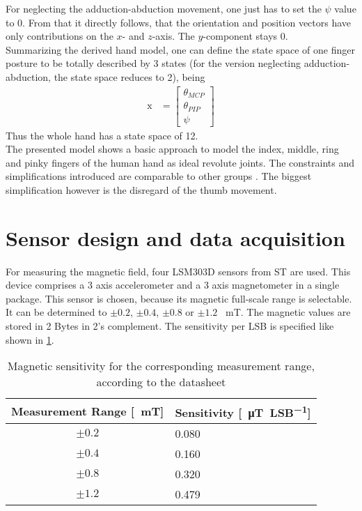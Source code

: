 For neglecting the adduction-abduction movement, one just has to set the $ \psi $ value to 0. From that it directly follows, that the orientation and position vectors have only contributions on the $ x $- and $ z $-axis. The $ y $-component stays 0.\\
Summarizing the derived hand model, one can define the state space of one finger posture to be totally described by 3 states (for the version neglecting adduction-abduction, the state space reduces to 2), being 
\begin{equation*}
\begin{aligned}
\mathrm{x} &= \begin{bmatrix}
				\theta_{MCP}\\
				\theta_{PIP}\\	
				\psi
\end{bmatrix}
\end{aligned}
\end{equation*}
Thus the whole hand has a state space of 12.\\
The presented model shows a basic approach to model the index, middle, ring and pinky fingers of the human hand as ideal revolute joints. The constraints and simplifications introduced are comparable to other groups \cite{lin2000modeling}. The biggest simplification however is the disregard of the thumb movement.



\section{Sensor design and data acquisition} \label{cha:sensors}

For measuring the magnetic field, four LSM303D sensors  from ST are used. This device comprises a 3 axis accelerometer and a 3 axis magnetometer in a single package. This sensor is chosen, because its magnetic full-scale range is selectable. It can be determined to $ \pm 0.2$, $ \pm 0.4 $, $ \pm 0.8 $ or $ \pm 1.2 $ \SI{}{\milli\tesla}. The magnetic values are stored in 2 Bytes in 2's complement. The sensitivity per \ac{LSB} is specified like shown in \ref{tab:magSensitivity}.

\begin{table}[h]
\centering
\begin{tabular}{|c|l|}
\hline
\textbf{Measurement Range [\SI{}{\milli\tesla}]} & \textbf{Sensitivity [\SI{}{\micro\tesla \per LSB}]} \\ \hline
$ \pm 0.2 $ & 0.080 \\ \hline
$ \pm 0.4 $ & 0.160 \\ \hline
$ \pm 0.8 $ & 0.320 \\ \hline
$ \pm 1.2 $ & 0.479 \\ \hline
\end{tabular}
\caption{Magnetic sensitivity for the corresponding measurement range, according to the datasheet}
\label{tab:magSensitivity}
\end{table}

